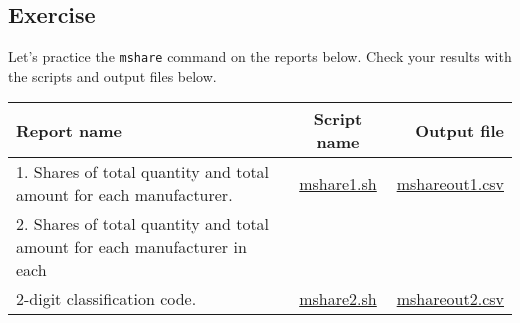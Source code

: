 \subsection{Exercise }

Let's practice the \verb|mshare| command on the reports below. Check your results with the scripts and output files below. 

\begin{table}[htbp]
{\small
\begin{tabular}{ l | c || r }
\hline
\textbf{Report name}   & \textbf{Script name} & \textbf{Output file}  \\
\hline
1. Shares of total quantity and total amount for each manufacturer. & \href{exercise/mshare1.sh}{mshare1.sh} & \href{exercise/outdat/mshareout1.csv}{mshareout1.csv} \\
2. Shares of total quantity and total amount for each manufacturer in each \\ 2-digit classification code. & \href{exercise/mshare2.sh}{mshare2.sh} & \href{exercise/outdat/mshareout2.csv}{mshareout2.csv} \\


\hline
\end{tabular} 
}
\end{table} 


%
